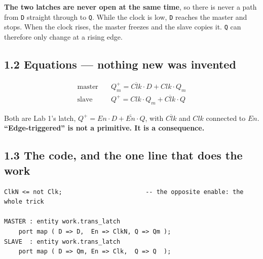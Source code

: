 \documentclass[11pt]{article}
\newcommand{\code}[1]{\texttt{#1}}
\begin{document}
\textbf{The two latches are never open at the same time}, so there is never a path
from \code{D} straight through to \code{Q}. While the clock is low, \code{D}
reaches the master and stops. When the clock rises, the master freezes and the
slave copies it. \code{Q} can therefore only change at a rising edge.

\begin{center}
\end{center}

\subsection*{1.2 Equations --- nothing new was invented}

\begin{align*}
\text{master} \quad & Q_m^{+} = \overline{Clk}\cdot D + Clk\cdot Q_m \\
\text{slave}  \quad & Q^{+}   = Clk\cdot Q_m + \overline{Clk}\cdot Q
\end{align*}

Both are Lab 1's latch, $Q^{+} = En\cdot D + \overline{En}\cdot Q$, with
$\overline{Clk}$ and $Clk$ connected to $En$. \textbf{``Edge-triggered'' is not a
primitive. It is a consequence.}

\subsection*{1.3 The code, and the one line that does the work}

\begin{lstlisting}
ClkN <= not Clk;                       -- the opposite enable: the whole trick

MASTER : entity work.trans_latch
    port map ( D => D,  En => ClkN, Q => Qm );
SLAVE  : entity work.trans_latch
    port map ( D => Qm, En => Clk,  Q => Q  );
\end{lstlisting}
\end{document}
